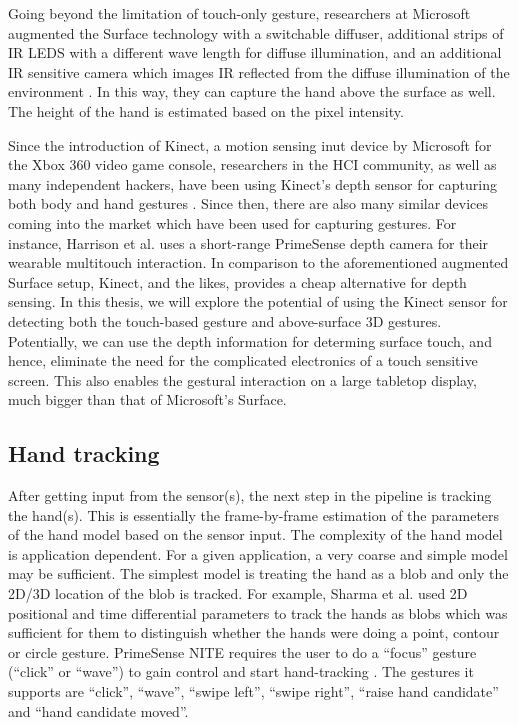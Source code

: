 Going beyond the limitation of touch-only gesture, researchers at Microsoft
augmented the Surface technology with a switchable diffuser, additional
strips of IR LEDS with a different wave length for diffuse illumination, and an
additional IR sensitive camera which images IR reflected from the diffuse
illumination of the environment \cite{hilliges09}. In this way, they can capture
the hand above the surface as well. The height of the hand is estimated based on
the pixel intensity.

Since the introduction of Kinect, a motion sensing inut device by Microsoft for
the Xbox 360 video game console, researchers in the HCI community, as well as
many independent hackers, have been using Kinect's depth sensor for capturing
both body and hand gestures \cite{openni}. Since then, there are also many
similar devices coming into the market which have been used for capturing
gestures. For instance, Harrison et al. \cite{harrison11} uses  a short-range
PrimeSense \cite{primesense} depth camera for their wearable multitouch
interaction. In comparison to the aforementioned augmented Surface setup,
Kinect, and the likes, provides a cheap alternative for depth sensing. In this
thesis, we will explore the potential of using the Kinect sensor for detecting 
both the touch-based gesture and above-surface 3D gestures. Potentially, we can 
use the depth information for determing surface touch, and hence, eliminate the 
need for the complicated electronics of a touch sensitive screen. This also 
enables the gestural interaction on a large tabletop display, much bigger than 
that of Microsoft's Surface.

\subsection{Hand tracking}
After getting input from the sensor(s), the next step in the pipeline is
tracking the hand(s). This is essentially the frame-by-frame estimation of the
parameters of the hand model based on the sensor input. The complexity of the
hand model is application dependent. For a given application, a very coarse and
simple model may be sufficient. The simplest model is treating the hand as a
blob and only the 2D/3D location of the blob is tracked. For example, Sharma et
al. \cite{sharma00} used 2D positional and time differential parameters to track
the hands as blobs which was sufficient for them to distinguish whether the
hands were doing a point, contour or circle gesture. PrimeSense NITE requires the user to do a ``focus'' gesture (``click'' or
``wave'') to gain control and start hand-tracking \cite{primesense-manual}. The
gestures it supports are ``click'', ``wave'', ``swipe left'', ``swipe right'',
``raise hand candidate'' and ``hand candidate moved''.

